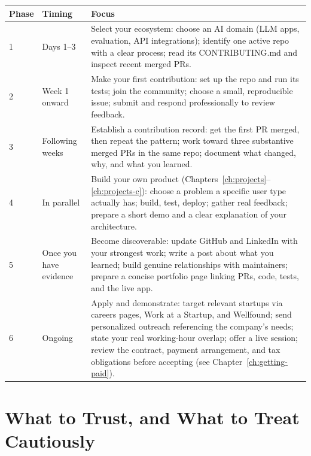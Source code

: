 \begin{longtable}{p{} p{} p{}}
\toprule
\textbf{Phase} & \textbf{Timing} & \textbf{Focus} \\
\midrule
\endhead
1 & Days 1--3 & Select your ecosystem: choose an AI domain (LLM apps, evaluation, API integrations); identify
one active repo with a clear process; read its CONTRIBUTING.md and inspect recent merged PRs. \\
2 & Week 1 onward & Make your first contribution: set up the repo and run its tests; join the community; choose
a small, reproducible issue; submit and respond professionally to review feedback. \\
3 & Following weeks & Establish a contribution record: get the first PR merged, then repeat the pattern; work
toward three substantive merged PRs in the same repo; document what changed, why, and what you learned. \\
4 & In parallel & Build your own product (Chapters~\ref{ch:projects}--\ref{ch:projects-c}): choose a problem a
specific user type actually has; build, test, deploy; gather real feedback; prepare a short demo and a clear
explanation of your architecture. \\
5 & Once you have evidence & Become discoverable: update GitHub and LinkedIn with your strongest work; write a
post about what you learned; build genuine relationships with maintainers; prepare a concise portfolio page
linking PRs, code, tests, and the live app. \\
6 & Ongoing & Apply and demonstrate: target relevant startups via careers pages, Work at a Startup, and
Wellfound; send personalized outreach referencing the company's needs; state your real working-hour overlap;
offer a live session; review the contract, payment arrangement, and tax obligations before accepting (see
Chapter~\ref{ch:getting-paid}). \\
\bottomrule
\end{longtable}

\section{What to Trust, and What to Treat Cautiously}

